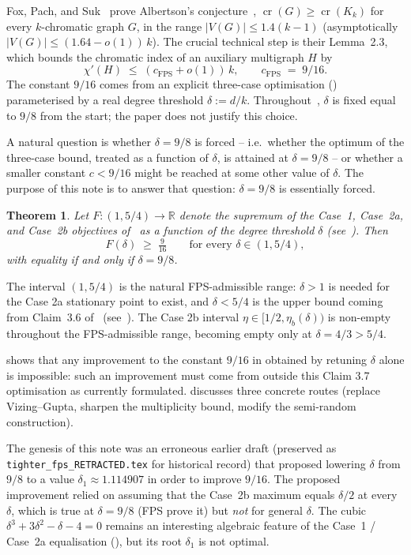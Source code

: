 \documentclass[11pt,a4paper]{article}
\newtheorem{theorem}{Theorem}
\theoremstyle{definition}
\newcommand{\cFPS}{c_{\mathrm{FPS}}}
\newcommand{\RR}{\mathbb{R}}
\newcommand{\chip}{\chi'}
\DeclareMathOperator{\crN}{cr}
\begin{document}
Fox, Pach, and Suk~\cite{FPS} prove Albertson's
conjecture~\cite{Albertson}, $\crN(G) \ge \crN(K_k)$ for every
$k$-chromatic graph $G$, in the range $|V(G)| \le 1.4(k-1)$
(asymptotically $|V(G)| \le (1.64 - o(1))\,k$). The crucial
technical step is their Lemma~2.3, which bounds the chromatic index
of an auxiliary multigraph $H$ by
\begin{equation}\label{eq:fpsbound}
   \chip(H) \;\le\; (\cFPS + o(1))\,k, \qquad \cFPS \;=\; 9/16.
\end{equation}
The constant $9/16$ comes from an explicit three-case optimisation
(\cite[Claim 3.7]{FPS}) parameterised by a real degree threshold
$\delta := d/k$. Throughout~\cite{FPS}, $\delta$ is fixed equal to
$9/8$ from the start; the paper does not justify this choice.

A natural question is whether $\delta = 9/8$ is forced -- i.e.\
whether the optimum of the three-case bound, treated as a function
of $\delta$, is attained at $\delta = 9/8$ -- or whether a smaller
constant $c < 9/16$ might be reached at some other value of
$\delta$. The purpose of this note is to answer that question:
$\delta = 9/8$ is essentially forced.

\begin{theorem}\label{thm:main}
Let $F : (1, 5/4) \to \RR$ denote the supremum of the Case~1,
Case~2a, and Case~2b objectives of~\cite[Claim 3.7]{FPS} as a
function of the degree threshold $\delta$
(see~). Then
\[
  F(\delta) \;\ge\; \tfrac{9}{16}
  \qquad \text{for every } \delta \in (1, 5/4),
\]
with equality if and only if $\delta = 9/8$.
\end{theorem}

The interval $(1, 5/4)$ is the natural FPS-admissible range:
$\delta > 1$ is needed for the Case 2a stationary point to exist,
and $\delta < 5/4$ is the upper bound coming from Claim~3.6
of~\cite{FPS} (see~). The Case 2b interval
$\eta \in [1/2, \eta_b(\delta))$ is non-empty throughout the
FPS-admissible range, becoming empty only at $\delta = 4/3 > 5/4$.

 shows that any improvement to the constant $9/16$ in
\cite[Lemma 2.3]{FPS} obtained by retuning $\delta$ alone is
impossible: such an improvement must come from outside this Claim
3.7 optimisation as currently formulated.
 discusses three concrete routes (replace
Vizing--Gupta, sharpen the multiplicity bound, modify the
semi-random construction).

The genesis of this note was an erroneous earlier draft (preserved
as \texttt{tighter\_fps\_\allowbreak RETRACTED.tex} for historical
record) that proposed lowering $\delta$ from $9/8$ to a value
$\delta_1 \approx 1.114907$ in order to improve $9/16$. The proposed improvement
relied on assuming that the Case~2b maximum equals $\delta/2$ at
every $\delta$, which is true at $\delta = 9/8$ (FPS prove it) but
\emph{not} for general $\delta$. The cubic
$\delta^3 + 3\delta^2 - \delta - 4 = 0$ remains an interesting
algebraic feature of the Case~1 / Case~2a equalisation
(), but its root $\delta_1$ is not optimal.
\end{document}
